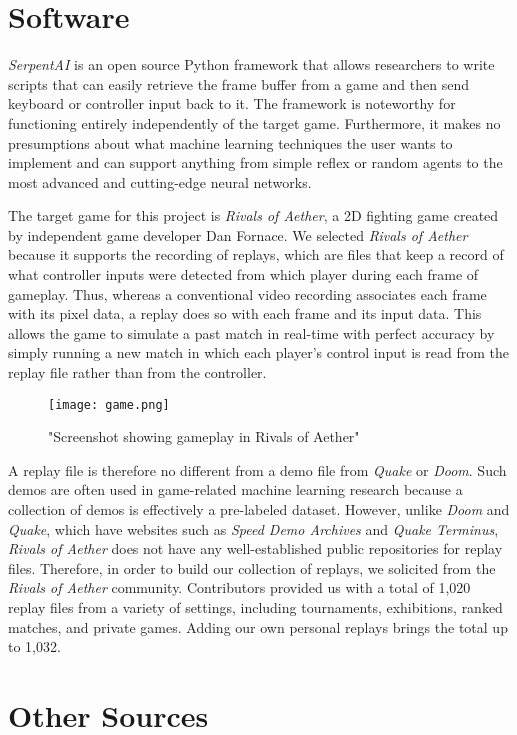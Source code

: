 \section{Software}
{\it SerpentAI} is an open source Python framework that allows researchers to write scripts that can easily retrieve the frame buffer from a game and then send keyboard or controller input back to it. The framework is noteworthy for functioning entirely independently of the target game. Furthermore, it makes no presumptions about what machine learning techniques the user wants to implement and can support anything from simple reflex or random agents to the most advanced and cutting-edge neural networks.

The target game for this project is {\it Rivals of Aether}, a 2D fighting game created by independent game developer Dan Fornace. We selected {\it Rivals of Aether} because it supports the recording of replays, which are files that keep a record of what controller inputs were detected from which player during each frame of gameplay. Thus, whereas a conventional video recording associates each frame with its pixel data, a replay does so with each frame and its input data. This allows the game to simulate a past match in real-time with perfect accuracy by simply running a new match in which each player's control input is read from the replay file rather than from the controller.

\begin{figure}
	\caption{"Screenshot showing gameplay in Rivals of Aether"}
	\centering
	\texttt{[image: game.png]} \\
\end{figure}

A replay file is therefore no different from a demo file from {\it Quake} or {\it Doom}. Such demos are often used in game-related machine learning research because a collection of demos is effectively a pre-labeled dataset. However, unlike {\it Doom} and {\it Quake}, which have websites such as {\it Speed Demo Archives} and {\it Quake Terminus}, {\it Rivals of Aether} does not have any well-established public repositories for replay files. Therefore, in order to build our collection of replays, we solicited from the {\it Rivals of Aether} community. Contributors provided us with a total of 1,020 replay files from a variety of settings, including tournaments, exhibitions, ranked matches, and private games. Adding our own personal replays brings the total up to 1,032. 




\section{Other Sources}



